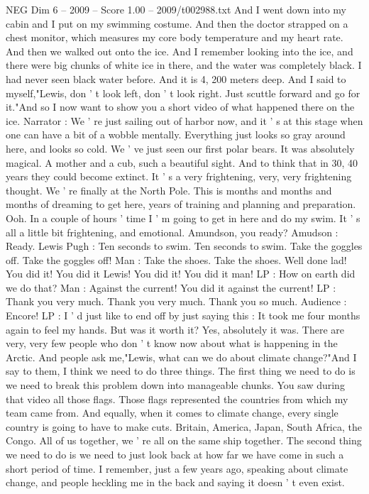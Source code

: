 \begin{textsample}{NEG Dim 6 – 2009 – Score 1.00 – 2009/t002988.txt}
And I went down into my cabin and I put on my swimming costume.
And then the doctor strapped on a chest monitor, which measures my core body temperature and my heart rate.
And then we walked out onto the ice.
And I remember looking into the ice, and there were big chunks of white ice in there, and the water was completely black.
I had never seen black water before.
And it is 4, 200 meters deep.
And I said to myself,"Lewis, don ' t look left, don ' t look right.
Just scuttle forward and go for it."And so I now want to show you a short video of what happened there on the ice.
Narrator : We ' re just sailing out of harbor now, and it ' s at this stage when one can have a bit of a wobble mentally.
Everything just looks so gray around here, and looks so cold.
We ' ve just seen our first polar bears.
It was absolutely magical.
A mother and a cub, such a beautiful sight.
And to think that in 30, 40 years they could become extinct.
It ' s a very frightening, very, very frightening thought.
We ' re finally at the North Pole.
This is months and months and months of dreaming to get here, years of training and planning and preparation.
Ooh.
In a couple of hours ' time I ' m going to get in here and do my swim.
It ' s all a little bit frightening, and emotional.
Amundson, you ready?
Amudson : Ready.
Lewis Pugh : Ten seconds to swim.
Ten seconds to swim.
Take the goggles off.
Take the goggles off!
Man : Take the shoes.
Take the shoes.
Well done lad!
You did it!
You did it Lewis!
You did it!
You did it man!
LP : How on earth did we do that?
Man : Against the current!
You did it against the current!
LP : Thank you very much.
Thank you very much.
Thank you so much.
Audience : Encore!
LP : I ' d just like to end off by just saying this : It took me four months again to feel my hands.
But was it worth it?
Yes, absolutely it was.
There are very, very few people who don ' t know now about what is happening in the Arctic.
And people ask me,"Lewis, what can we do about climate change?"And I say to them, I think we need to do three things.
The first thing we need to do is we need to break this problem down into manageable chunks.
You saw during that video all those flags.
Those flags represented the countries from which my team came from.
And equally, when it comes to climate change, every single country is going to have to make cuts.
Britain, America, Japan, South Africa, the Congo.
All of us together, we ' re all on the same ship together.
The second thing we need to do is we need to just look back at how far we have come in such a short period of time.
I remember, just a few years ago, speaking about climate change, and people heckling me in the back and saying it doesn ' t even exist.

\end{textsample}
